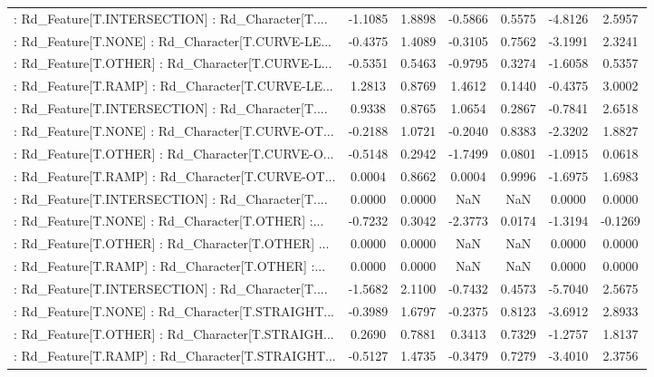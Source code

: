 \begin{longtable}{p{4cm}cccccc}
 : Rd\_Feature[T.INTERSECTION] : Rd\_Character[T.... & -1.1085 &    1.8898 & -0.5866 &       0.5575 & -4.8126 &  2.5957 \\
 : Rd\_Feature[T.NONE] : Rd\_Character[T.CURVE-LE... & -0.4375 &    1.4089 & -0.3105 &       0.7562 & -3.1991 &  2.3241 \\
 : Rd\_Feature[T.OTHER] : Rd\_Character[T.CURVE-L... & -0.5351 &    0.5463 & -0.9795 &       0.3274 & -1.6058 &  0.5357 \\
 : Rd\_Feature[T.RAMP] : Rd\_Character[T.CURVE-LE... &  1.2813 &    0.8769 &  1.4612 &       0.1440 & -0.4375 &  3.0002 \\
 : Rd\_Feature[T.INTERSECTION] : Rd\_Character[T.... &  0.9338 &    0.8765 &  1.0654 &       0.2867 & -0.7841 &  2.6518 \\
 : Rd\_Feature[T.NONE] : Rd\_Character[T.CURVE-OT... & -0.2188 &    1.0721 & -0.2040 &       0.8383 & -2.3202 &  1.8827 \\
 : Rd\_Feature[T.OTHER] : Rd\_Character[T.CURVE-O... & -0.5148 &    0.2942 & -1.7499 &       0.0801 & -1.0915 &  0.0618 \\
 : Rd\_Feature[T.RAMP] : Rd\_Character[T.CURVE-OT... &  0.0004 &    0.8662 &  0.0004 &       0.9996 & -1.6975 &  1.6983 \\
 : Rd\_Feature[T.INTERSECTION] : Rd\_Character[T.... &  0.0000 &    0.0000 &     NaN &          NaN &  0.0000 &  0.0000 \\
 : Rd\_Feature[T.NONE] : Rd\_Character[T.OTHER] :... & -0.7232 &    0.3042 & -2.3773 &       0.0174 & -1.3194 & -0.1269 \\
 : Rd\_Feature[T.OTHER] : Rd\_Character[T.OTHER] ... &  0.0000 &    0.0000 &     NaN &          NaN &  0.0000 &  0.0000 \\
 : Rd\_Feature[T.RAMP] : Rd\_Character[T.OTHER] :... &  0.0000 &    0.0000 &     NaN &          NaN &  0.0000 &  0.0000 \\
 : Rd\_Feature[T.INTERSECTION] : Rd\_Character[T.... & -1.5682 &    2.1100 & -0.7432 &       0.4573 & -5.7040 &  2.5675 \\
 : Rd\_Feature[T.NONE] : Rd\_Character[T.STRAIGHT... & -0.3989 &    1.6797 & -0.2375 &       0.8123 & -3.6912 &  2.8933 \\
 : Rd\_Feature[T.OTHER] : Rd\_Character[T.STRAIGH... &  0.2690 &    0.7881 &  0.3413 &       0.7329 & -1.2757 &  1.8137 \\
 : Rd\_Feature[T.RAMP] : Rd\_Character[T.STRAIGHT... & -0.5127 &    1.4735 & -0.3479 &       0.7279 & -3.4010 &  2.3756 \\

\end{longtable}
